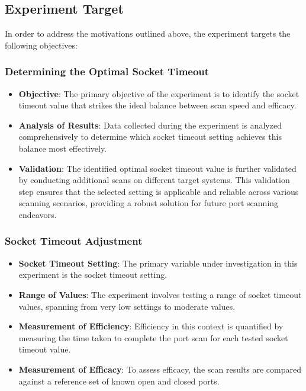 \subsection{Experiment Target}

In order to address the motivations outlined above, the experiment targets the following objectives:

\subsubsection{Determining the Optimal Socket Timeout}

\begin{itemize}
  \item \textbf{Objective}: The primary objective of the experiment is to identify the socket timeout value that strikes the ideal balance between scan speed and efficacy.
  
  \item \textbf{Analysis of Results}: Data collected during the experiment is analyzed comprehensively to determine which socket timeout setting achieves this balance most effectively.
  
  \item \textbf{Validation}: The identified optimal socket timeout value is further validated by conducting additional scans on different target systems. This validation step ensures that the selected setting is applicable and reliable across various scanning scenarios, providing a robust solution for future port scanning endeavors.
\end{itemize}

\subsubsection{Socket Timeout Adjustment}

\begin{itemize}
  \item \textbf{Socket Timeout Setting}: The primary variable under investigation in this experiment is the socket timeout setting.
  
  \item \textbf{Range of Values}: The experiment involves testing a range of socket timeout values, spanning from very low settings to moderate values.
  
  \item \textbf{Measurement of Efficiency}: Efficiency in this context is quantified by measuring the time taken to complete the port scan for each tested socket timeout value.
  
  \item \textbf{Measurement of Efficacy}: To assess efficacy, the scan results are compared against a reference set of known open and closed ports.
\end{itemize}

